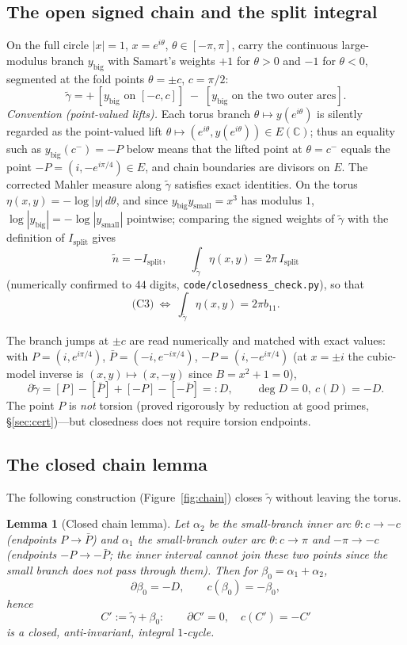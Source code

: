 \documentclass[11pt]{amsart}
\newtheorem{lemma}[theorem]{Lemma}
\theoremstyle{definition}
\theoremstyle{remark}
\newcommand{\C}{\mathbb{C}}
\begin{document}
\subsection{The open signed chain and the split integral}

On the full circle $|x|=1$, $x=e^{i\theta}$, $\theta\in[-\pi,\pi]$, carry the
continuous large-modulus branch $y_{\mathrm{big}}$ with Samart's weights
$+1$ for $\theta>0$ and $-1$ for $\theta<0$, segmented at the fold points
$\theta=\pm c$, $c=\pi/2$:
\[
  \tilde\gamma
  =+\,[y_{\mathrm{big}}\text{ on }[-c,c]]
  \;-\;[y_{\mathrm{big}}\text{ on the two outer arcs}].
\]
\emph{Convention (point-valued lifts).}  Each torus branch
$\theta\mapsto y(e^{i\theta})$ is silently regarded as the point-valued
lift $\theta\mapsto(e^{i\theta},y(e^{i\theta}))\in E(\C)$; thus an
equality such as $y_{\mathrm{big}}(c^-)=-P$ below means that the lifted
point at $\theta=c^-$ equals the point $-P=(i,-e^{i\pi/4})\in E$, and
chain boundaries are divisors on $E$.
The corrected Mahler measure along $\tilde\gamma$ satisfies exact
identities. On the torus $\eta(x,y)=-\log|y|\,d\theta$, and since
$y_{\mathrm{big}}y_{\mathrm{small}}=x^3$ has modulus $1$,
$\log|y_{\mathrm{big}}|=-\log|y_{\mathrm{small}}|$ pointwise; comparing the
signed weights of $\tilde\gamma$ with the definition of $I_{\mathrm{split}}$
gives
\[
  \tilde n=-I_{\mathrm{split}},\qquad
  \int_{\tilde\gamma}\eta(x,y)=2\pi\,I_{\mathrm{split}}
\]
(numerically confirmed to $44$ digits,
\texttt{code/closedness\_check.py}), so that
\[
  \text{(C3)}\ \Longleftrightarrow\ \int_{\tilde\gamma}\eta(x,y)=2\pi b_{11}.
\]

The branch jumps at $\pm c$ are read numerically and matched with exact
values: with $P=(i,e^{i\pi/4})$, $\bar P=(-i,e^{-i\pi/4})$,
$-P=(i,-e^{i\pi/4})$ (at $x=\pm i$ the cubic-model inverse is
$(x,y)\mapsto(x,-y)$ since $B=x^2+1=0$),
\[
  \partial\tilde\gamma=[P]-[\bar P]+[-P]-[-\bar P]=:D,
  \qquad \deg D=0,\ c(D)=-D.
\]
The point $P$ is \emph{not} torsion (proved rigorously by reduction at good
primes, \S\ref{sec:cert})---but closedness does not
require torsion endpoints.

\subsection{The closed chain lemma}

The following construction (Figure~\ref{fig:chain}) closes $\tilde\gamma$
without leaving the torus.

\begin{lemma}[Closed chain lemma]\label{lem:closed}Let $\alpha_2$ be the small-branch inner arc $\theta:c\to-c$ (endpoints
$P\to\bar P$) and $\alpha_1$ the small-branch outer arc
$\theta:c\to\pi$ and $-\pi\to-c$ (endpoints $-P\to-\bar P$; the inner
interval cannot join these two points since the small branch does not pass
through them). Then for $\beta_0=\alpha_1+\alpha_2$,
\[
  \partial\beta_0=-D,\qquad c(\beta_0)=-\beta_0,
\]
hence
\[
  C':=\tilde\gamma+\beta_0:\qquad \partial C'=0,\quad c(C')=-C'
\]
is a closed, anti-invariant, integral $1$-cycle.
\end{lemma}
\end{document}

